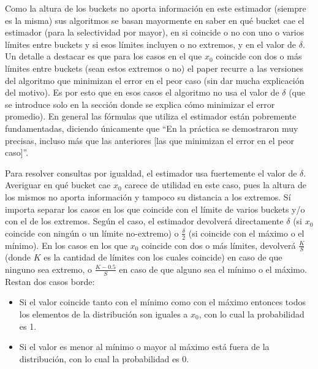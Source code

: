Como la altura de los buckets no aporta información en este estimador (siempre es la misma) sus algoritmos se basan mayormente en saber en qué bucket cae el estimador (para la selectividad por mayor), en si coincide o no con uno o varios límites entre buckets y si esos límites incluyen o no extremos, y en el valor de $\delta$. Un detalle a destacar es que para los casos en el que $x_0$ coincide con dos o más límites entre buckets (sean estos extremos o no) el paper recurre a las versiones del algoritmo que minimizan el error en el peor caso (sin dar mucha explicación del motivo). Es por esto que en esos casos el algoritmo no usa el valor de $\delta$ (que se introduce solo en la sección donde se explica cómo minimizar el error promedio). En general las fórmulas que utiliza el estimador están pobremente fundamentadas, diciendo únicamente que ``En la práctica se demostraron muy precisas, incluso más que las anteriores [las que minimizan el error en el peor caso]''.

Para resolver consultas por igualdad, el estimador usa fuertemente el valor de $\delta$. Averiguar en qué bucket cae $x_0$ carece de utilidad en este caso, pues la altura de los mismos no aporta información y tampoco su distancia a los extremos. Sí importa separar los casos en los que coincide con el límite de varios buckets y/o con el de los extremos. Según el caso, el estimador devolverá directamente $\delta$ (si $x_0$ coincide con ningún o un límite no-extremo) o $\frac{\delta}{2}$ (si coincide con el máximo o el mínimo). En los casos en los que $x_0$ coincide con dos o más límites, devolverá $\frac{K}{S}$ (donde $K$ es la cantidad de límites con los cuales coincide) en caso de que ninguno sea extremo, o $\frac{K-0.5}{S}$ en caso de que alguno sea el mínimo o el máximo. Restan dos casos borde:
\begin{itemize}
 \item Si el valor coincide tanto con el mínimo como con el máximo entonces todos los elementos de la distribución son iguales a $x_0$, con lo cual la probabilidad es 1.
 \item Si el valor es menor al mínimo o mayor al máximo está fuera de la distribución, con lo cual la probabilidad es 0.
\end{itemize}

